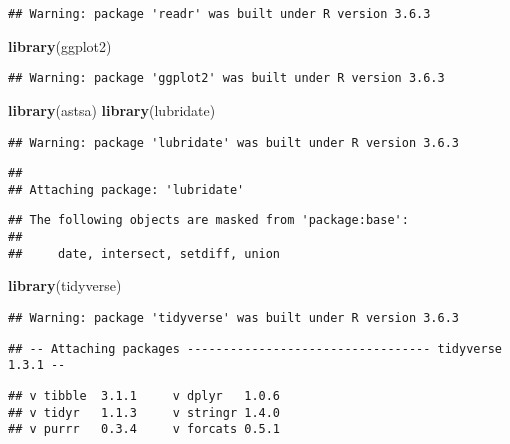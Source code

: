 \documentclass[]{article}
\newenvironment{Shaded}{\begin{snugshade}}{\end{snugshade}}
\newcommand{\KeywordTok}[1]{\textcolor[rgb]{0.13,0.29,0.53}{\textbf{#1}}}
\newcommand{\NormalTok}[1]{#1}
\begin{document}
\begin{verbatim}
## Warning: package 'readr' was built under R version 3.6.3
\end{verbatim}

\begin{Shaded}
\begin{Highlighting}[]
\KeywordTok{library}\NormalTok{(ggplot2)}
\end{Highlighting}
\end{Shaded}

\begin{verbatim}
## Warning: package 'ggplot2' was built under R version 3.6.3
\end{verbatim}

\begin{Shaded}
\begin{Highlighting}[]
\KeywordTok{library}\NormalTok{(astsa)}
\KeywordTok{library}\NormalTok{(lubridate)}
\end{Highlighting}
\end{Shaded}

\begin{verbatim}
## Warning: package 'lubridate' was built under R version 3.6.3
\end{verbatim}

\begin{verbatim}
## 
## Attaching package: 'lubridate'
\end{verbatim}

\begin{verbatim}
## The following objects are masked from 'package:base':
## 
##     date, intersect, setdiff, union
\end{verbatim}

\begin{Shaded}
\begin{Highlighting}[]
\KeywordTok{library}\NormalTok{(tidyverse)}
\end{Highlighting}
\end{Shaded}

\begin{verbatim}
## Warning: package 'tidyverse' was built under R version 3.6.3
\end{verbatim}

\begin{verbatim}
## -- Attaching packages ---------------------------------- tidyverse 1.3.1 --
\end{verbatim}

\begin{verbatim}
## v tibble  3.1.1     v dplyr   1.0.6
## v tidyr   1.1.3     v stringr 1.4.0
## v purrr   0.3.4     v forcats 0.5.1
\end{verbatim}
\end{document}
